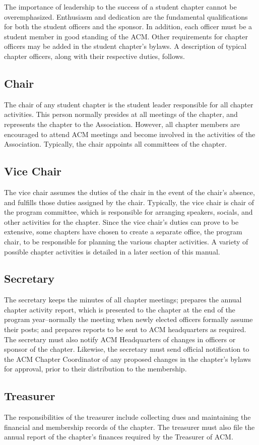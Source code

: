 The importance of leadership to the success of a student chapter cannot be overemphasized. Enthusiasm and dedication are the fundamental qualifications for both the student officers and the sponsor. In addition, each officer must be a student member in good standing of the ACM. Other requirements for chapter officers may be added in the student chapter's bylaws. A description of typical chapter officers, along with their respective duties, follows.
\subsection*{Chair}
The chair of any student chapter is the student leader responsible for all chapter activities. This person normally presides at all meetings of the chapter, and represents the chapter to the Association. However, all chapter members are encouraged to attend ACM meetings and become involved in the activities of the Association. Typically, the chair appoints all committees of the chapter.
\subsection*{Vice Chair}
The vice chair assumes the duties of the chair in the event of the chair's absence, and fulfills those duties assigned by the chair. Typically, the vice chair is chair of the program committee, which is responsible for arranging speakers, socials, and other activities for the chapter. Since the vice chair's duties can prove to be extensive, some chapters have chosen to create a separate office, the program chair, to be responsible for planning the various chapter activities. A variety of possible chapter activities is detailed in a later section of this manual.
\subsection*{Secretary}
The secretary keeps the minutes of all chapter meetings; prepares the annual chapter activity report, which is presented to the chapter at the end of the program year--normally the meeting when newly elected officers formally assume their posts; and prepares reports to be sent to ACM headquarters as required. The secretary must also notify ACM Headquarters of changes in officers or sponsor of the chapter. Likewise, the secretary must send official notification to the ACM Chapter Coordinator of any proposed changes in the chapter's bylaws for approval, prior to their distribution to the membership.
\subsection*{Treasurer}
The responsibilities of the treasurer include collecting dues and maintaining the financial and membership records of the chapter. The treasurer must also file the annual report of the chapter's finances required by the Treasurer of ACM.
